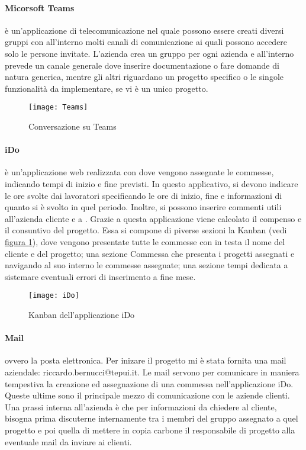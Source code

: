 \paragraph{Micorsoft Teams} è un'applicazione di telecomunicazione nel quale possono essere creati diversi gruppi con all'interno molti canali di comunicazione ai quali possono accedere solo le persone invitate. L'azienda crea un gruppo per ogni azienda e all'interno prevede un canale generale dove inserire documentazione o fare domande di natura generica, mentre gli altri riguardano un progetto specifico o le singole funzionalità da implementare, se vi è un unico progetto. 

\begin{figure}[!h] 
	\centering 
	\texttt{[image: Teams]} 
	\caption{Conversazione su Teams}
\end{figure}


\paragraph{iDo} è un'applicazione web realizzata con \inde dove vengono assegnate le commesse, indicando tempi di inizio e fine previsti. In questo applicativo, si devono indicare le ore svolte dai lavoratori specificando le ore di inizio, fine e informazioni di quanto si è svolto in quel periodo. Inoltre, si possono inserire commenti utili all'azienda cliente e a \azienda. 
Grazie a questa applicazione viene calcolato il compenso e il consuntivo del progetto. Essa si compone di piverse sezioni la Kanban (vedi \hyperref[ido]{figura \ref{ido}}), dove vengono presentate tutte le commesse con in testa il nome del cliente e del progetto; una sezione Commessa che presenta i progetti assegnati e navigando al suo interno le commesse assegnate; una sezione tempi dedicata a sistemare eventuali errori di inserimento a fine mese.

\begin{figure}[!h] 
	\centering 
	\texttt{[image: iDo]} 
	\caption{Kanban dell'applicazione iDo}
	\label{ido}
\end{figure}

\paragraph{Mail} ovvero la posta elettronica. Per inizare il progetto mi è stata fornita una mail aziendale: riccardo.bernucci@tepui.it. Le mail servono per comunicare in maniera tempestiva la creazione ed assegnazione di una commessa nell'applicazione iDo. Queste ultime sono il principale mezzo di comunicazione con le aziende clienti. Una prassi interna all'azienda è che per informazioni da chiedere al cliente, bisogna prima discuterne internamente tra i membri del gruppo assegnato a quel progetto e poi quella di mettere in copia carbone il responsabile di progetto alla eventuale mail da inviare ai clienti.


